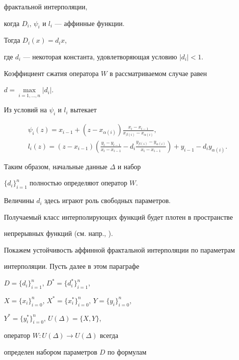 фрактальной интерполяции,


когда $D_i$, $\psi_i$ и $l_i$ --- аффинные функции.


Тогда $D_i (x)=d_i x$,


где $d_i$ --- некоторая константа, удовлетворяющая условию $|d_i|<1$.


Коэффициент сжатия оператора $W$ в рассматриваемом случае равен


$d = \max\limits_{i=1,\dotsc,n} | d_i | $.





Из условий на $\psi_i$ и $l_i$ вытекает


\begin{gather} \label{defpsi}


\psi_i(z)=x_{i-1}+(z-x_{\alpha(i)})


\frac{x_i-x_{i-1}}{x_{\beta(i)}-x_{\alpha(i)}}, \\


%


\label{defl} l_i(z) = (z-x_{i-1})\left(\frac{y_i-y_{i-1}}{x_i-x_{i-1}}- d_i


\frac{y_{\beta(i)}-y_{\alpha(i)}}{x_i-x_{i-1}} \right) +


y_{i-1} - d_i y_{\alpha(i)}.


\end{gather}


Таким образом, начальные данные $\Delta$ и набор


$\{d_i\}_{i=1}^n$ полностью определяют оператор $W$.


Величины $d_i$ здесь играют роль свободных параметров.


Получаемый класс интерполирующих функций будет плотен в пространстве


непрерывных функций (см. напр., \cite{barnsley1}).





Покажем устойчивость аффинной фрактальной интерполяции по параметрам


интерполяции. Пусть далее в этом параграфе


$D=\{d_i\}_{i=1}^n$, $D^*=\{d_i^*\}_{i=1}^n$,


$X=\{x_i\}_{i=0}^n$, $X^*=\{x_i^*\}_{i=0}^n$, $Y=\{y_i\}_{i=0}^n$,


$Y^*=\{y_i^*\}_{i=0}^n$, $U(\Delta) =\{X,Y\}$,


оператор $W:U(\Delta) \to U(\Delta)$ всегда


определен набором параметров $D$ по формулам


